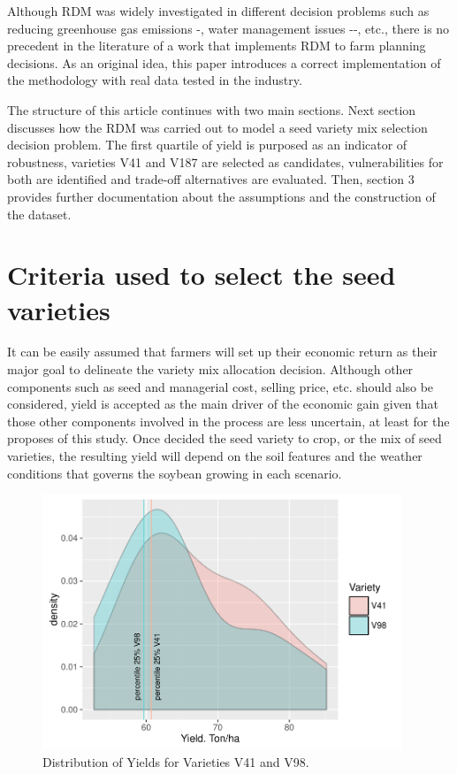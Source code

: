 \documentclass[syngen,nonblindrev]{informs3-syngen}
\begin{document}
Although RDM was widely investigated in different decision problems such as reducing greenhouse gas emissions -\cite{lempert1996we}, water management issues -\cite{groves2008planning}-, etc., there is no precedent in the literature of a work that implements RDM to farm planning decisions. 
As an original idea, this paper introduces a correct implementation of the methodology with real data tested in the industry.\par 
The structure of this article continues with two main sections. 
Next section discusses how the RDM was carried out to model a seed variety mix selection decision problem. The first quartile of yield is purposed as an indicator of robustness, varieties V41 and V187 are selected as candidates, vulnerabilities for both are identified and trade-off alternatives are evaluated. 
Then, section 3 provides further documentation about the assumptions and the construction of the dataset. 


\section{Criteria used to select the seed varieties}

It can be easily assumed that farmers will set up their economic return as their major goal to delineate the variety mix allocation decision.
Although other components such as seed and managerial cost, selling price, etc. should also be considered, yield is accepted as the main driver of the economic gain given that those other components involved in the process are less uncertain, at least for the proposes of this study. 
Once decided the seed variety to crop, or the mix of seed varieties, the resulting yield will depend on the soil features and the weather conditions that governs the soybean growing in each scenario. 

\begin{figure}[t]
\begin{center}
\includegraphics[height=3in]{density2}
\caption{Distribution of Yields for Varieties V41 and V98.} \label{denplot}
\end{center}
\end{figure}
\end{document}
